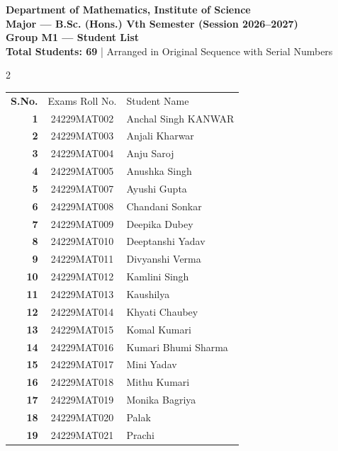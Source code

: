 \documentclass[10pt,a4paper]{article}
\begin{document}
\begin{center}
    {\LARGE \textbf{\color{headerblue} Department of Mathematics, Institute of Science}}\\[4pt]
    {\large \textbf{Major --- B.Sc. (Hons.) Vth Semester (Session 2026--2027)}}\\[4pt]
    {\Large \textbf{\color{headerblue} Group M1 --- Student List}}\\[4pt]
    \small \textbf{Total Students: 69} \quad | \quad Arranged in Original Sequence with Serial Numbers
\end{center}

\vspace{6pt}

\setlength{\tabcolsep}{6pt}
\renewcommand{\arraystretch}{1.2}

\begin{multicols}{2}
\noindent
\begin{tabular}{>{\boldmath\bfseries\color{headerblue}}r c l}
\rowcolor{headerblue}
\color{white}S.No. & \color{white}Exams Roll No. & \color{white}Student Name \\
1 & 24229MAT002 & Anchal Singh KANWAR \\
2 & 24229MAT003 & Anjali Kharwar \\
3 & 24229MAT004 & Anju Saroj \\
4 & 24229MAT005 & Anushka Singh \\
5 & 24229MAT007 & Ayushi Gupta \\
6 & 24229MAT008 & Chandani Sonkar \\
7 & 24229MAT009 & Deepika Dubey \\
8 & 24229MAT010 & Deeptanshi Yadav \\
9 & 24229MAT011 & Divyanshi Verma \\
10 & 24229MAT012 & Kamlini Singh \\
11 & 24229MAT013 & Kaushilya \\
12 & 24229MAT014 & Khyati Chaubey \\
13 & 24229MAT015 & Komal Kumari \\
14 & 24229MAT016 & Kumari Bhumi Sharma \\
15 & 24229MAT017 & Mini Yadav \\
16 & 24229MAT018 & Mithu Kumari \\
17 & 24229MAT019 & Monika Bagriya \\
18 & 24229MAT020 & Palak \\
19 & 24229MAT021 & Prachi \\

\end{tabular}
\end{multicols}
\end{document}
